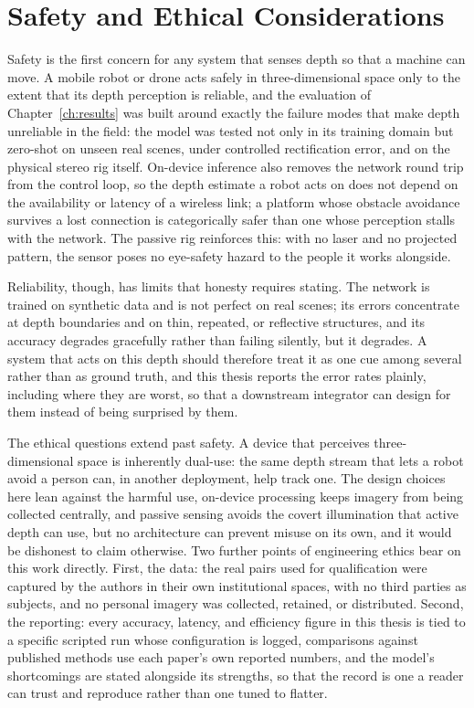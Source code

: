 \FloatBarrier
\section{Safety and Ethical Considerations}
\label{sec:safety_ethics}
Safety is the first concern for any system that senses depth so that a
machine can move. A mobile robot or drone acts safely in
three-dimensional space only to the extent that its depth perception is
reliable, and the evaluation of Chapter~\ref{ch:results} was built around
exactly the failure modes that make depth unreliable in the field: the
model was tested not only in its training domain but zero-shot on unseen
real scenes, under controlled rectification error, and on the physical
stereo rig itself. On-device inference also removes the network round
trip from the control loop, so the depth estimate a robot acts on does
not depend on the availability or latency of a wireless link; a platform
whose obstacle avoidance survives a lost connection is categorically safer
than one whose perception stalls with the network. The passive rig
reinforces this: with no laser and no projected pattern, the sensor poses
no eye-safety hazard to the people it works alongside.

Reliability, though, has limits that honesty requires stating. The
network is trained on synthetic data and is not perfect on real scenes;
its errors concentrate at depth boundaries and on thin, repeated, or
reflective structures, and its accuracy degrades gracefully rather than
failing silently, but it degrades. A system that acts on this depth
should therefore treat it as one cue among several rather than as ground
truth, and this thesis reports the error rates plainly, including where
they are worst, so that a downstream integrator can design for them
instead of being surprised by them.

The ethical questions extend past safety. A device that perceives
three-dimensional space is inherently dual-use: the same depth stream
that lets a robot avoid a person can, in another deployment, help track
one. The design choices here lean against the harmful use, on-device
processing keeps imagery from being collected centrally, and passive
sensing avoids the covert illumination that active depth can use, but no
architecture can prevent misuse on its own, and it would be dishonest to
claim otherwise. Two further points of engineering ethics bear on this
work directly. First, the data: the real pairs used for qualification
were captured by the authors in their own institutional spaces, with no
third parties as subjects, and no personal imagery was collected,
retained, or distributed. Second, the reporting: every accuracy, latency,
and efficiency figure in this thesis is tied to a specific scripted run
whose configuration is logged, comparisons against published methods use
each paper's own reported numbers, and the model's shortcomings are
stated alongside its strengths, so that the record is one a reader can
trust and reproduce rather than one tuned to flatter.

